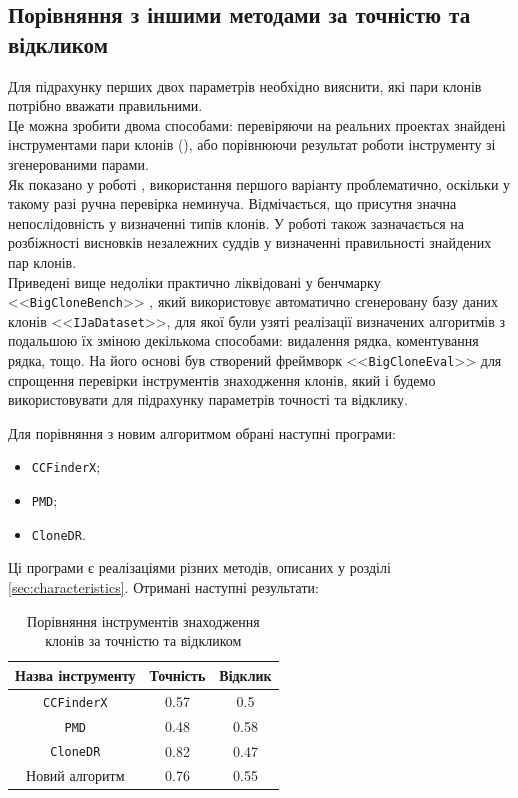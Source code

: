 \documentclass[a4paper, 14pt]{article}
\begin{document}
\subsection{Порівняння з іншими методами за точністю та відкликом}
\par Для підрахунку перших двох параметрів необхідно вияснити, які пари клонів потрібно вважати правильними. \\ 
Це можна зробити двома способами: перевіряючи на реальних проектах знайдені інструментами пари клонів (\cite{Bellon07}), або порівнюючи результат роботи інструменту зі згенерованими парами. \\ 
Як показано у роботі \cite{Roy18}, використання першого варіанту проблематично, оскільки у такому разі ручна перевірка неминуча. Відмічається, що присутня значна непослідовність у визначенні типів клонів. У роботі \cite{Charpentier15} також зазначається на розбіжності висновків незалежних суддів у визначенні правильності знайдених пар клонів. \\
Приведені вище недоліки практично ліквідовані у бенчмарку <<\verb|BigCloneBench|>> \cite{Svajlenko14}, який використовує автоматично сгенеровану базу даних клонів <<\verb|IJaDataset|>>, для якої були узяті реалізації визначених алгоритмів з подальшою їх зміною декількома способами: видалення рядка, коментування рядка, тощо. На його основі був створений фреймворк <<\verb|BigCloneEval|>> для спрощення перевірки інструментів знаходження клонів, який і будемо використовувати для підрахунку параметрів точності та відклику. \par
Для порівняння з новим алгоритмом обрані наступні програми:
\begin{itemize}
\item \verb|CCFinderX|;
\item \verb|PMD|;
\item \verb|CloneDR|.
\end{itemize}
Ці програми є реалізаціями різних методів, описаних у розділі \ref{sec:characteristics}.
Отримані наступні результати: \\
\begin{table}[ht]
\centering
\caption{\centering Порівняння інструментів знаходження клонів за точністю та відкликом}
 \begin{tabular}{| c | c | c |} 
 \hline
 Назва інструменту & Точність & Відклик \\ [0.5ex] 
 \hline
 \verb|CCFinderX| & 0.57 & 0.5 \\ 
 \hline
 \verb|PMD| & 0.48 & 0.58 \\
 \hline
 \verb|CloneDR| & 0.82 & 0.47 \\
 \hline
 Новий алгоритм & 0.76 & 0.55 \\ [1ex]
 \hline
\end{tabular} 
\end{table} \\
\end{document}
